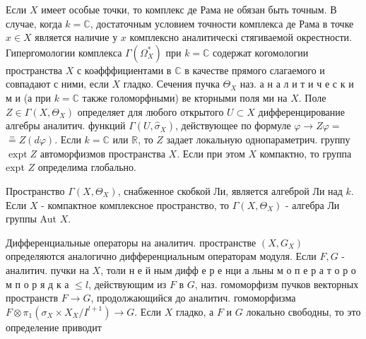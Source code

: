 \documentclass[10pt]{article}
\begin{document}
Если $X$ имеет особые точки, то комплекс де Рама не обязан быть точным. В случае, когда $k=\mathbb{C}$, достаточным условием точности комплекса де Рама в точке $x \in X$ является наличие у $x$ комплексно аналитическі стягиваемой окрестности. Гипергомологии комплекса $\Gamma\left(\Omega_{X}^{*}\right)$ при $k=\mathbb{C}$ содержат когомологии пространства $X$ с коәфффициентами в $\mathbb{C}$ в качестве прямого слагаемого и совпадают с ними, если $X$ гладко. Сечения пучка $\Theta_{X}$ наз. а н а л и т и ч е с к и м и (а при $k=\mathbb{C}$ также голоморфными) ве кторными поля ми на $X$. Поле $Z \in \Gamma\left(X, \Theta_{X}\right)$ определяет для любого открытого $U \subset X$ дифференцирование алгебры аналитич. функций $\Gamma\left(U, \hat{\sigma}_{X}\right)$, действующее по формуле $\varphi \rightarrow Z \varphi=$ $\stackrel{=}{=} Z(d \varphi)$. Если $k=\mathbb{C}$ или $\mathbb{R}$, то $Z$ задает локальную однопараметрич. группу $\operatorname{expt} Z$ автоморфизмов пространства $X$. Если при этом $X$ компактно, то группа expt $Z$ определима глобально.



Пространство $\Gamma\left(X, \Theta_{X}\right)$, снабженное скобкой Ли, является алгеброй Ли над $k$. Если $X$ - компактное комплексное пространство, то $\Gamma\left(X, \Theta_{X}\right)$ - алгебра Ли группы Aut $X$.



Дифференциальные операторы на аналитич. пространстве $\left(X, G_{X}\right)$ определяются аналогично дифференциальным операторам модуля. Если $F, G$ - аналитич. пучки на $X$, толи н е й ным дифф е р е нци а льны м о п е р а т о р о м п о р я д к а $\leqslant l$, действующим из $F$ в $G$, наз. гомоморфизм пучков векторных пространств $F \rightarrow G$, продолжающийся до аналитич. гомоморфизма $F \otimes \pi_{1}\left(\sigma_{X} \times X_{X} / I^{l+1}\right) \rightarrow G$. Если $X$ гладко, а $F$ и $G$ локально свободны, то это определение приводит
\end{document}
